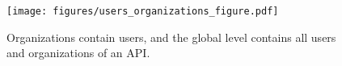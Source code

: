 \begin{figure}[t]
    \centering
    \texttt{[image: figures/users\_organizations\_figure.pdf]}
    \vspace{-0.15in}
    \caption{
        Organizations contain users, and the global level contains all users and organizations of an API.
    }
    \label{fig:users-organizations}
    \vspace{-0.15in}
\end{figure}
